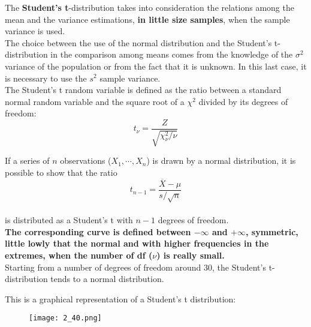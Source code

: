 \begin{frame}
  \vspace*{.3cm}
  The \textbf{Student's t}-distribution takes into consideration the relations among the mean and the variance estimations, \textbf{in little size samples}, when the sample variance is used.\\
  \vspace*{.3cm}
  The choice between the use of the normal distribution and the Student's t-distribution in the comparison among means comes from the knowledge of the $ \sigma^2 $ variance of the population or from the fact that it is unknown. In this last case, it is necessary to use the $ s^2 $ sample variance.\\
  \vspace*{.3cm}
  The Student's t random variable is defined as the ratio between a standard normal random variable and the square root of a $ \chi^2 $ divided by its degrees of freedom:
  $$ t_\nu = \frac{Z}{\sqrt{\chi^2_\nu/\nu}} $$
\end{frame}

\begin{frame}
  If a series of $ n $ observations ($ X_1, \cdots , X_n $) is drawn by a normal distribution, it is possible to show that the ratio
  \vspace*{.2cm}
  $$t_{n-1}=\frac{\overline{X}-\mu}{s/\sqrt{n}}$$\\
  \vspace*{.2cm}
  is distributed as a Student's t with $ n - 1 $ degrees of freedom. \\
  \vspace*{.5cm}
  \textbf{The corresponding curve is defined between $-\infty$ and $+\infty$, symmetric, little lowly that the normal and with higher frequencies in the extremes, when the number of df ({\boldmath $ \nu $}) is really small.}\\
  \vspace*{.5cm}
  Starting from a number of degrees of freedom around 30, the Student's t-distribution tends to a normal distribution.
\end{frame}

\begin{frame}
  \vspace*{.5cm}
  \centering
  This is a graphical representation of a Student's t distribution:\\
  \begin{figure}
    \texttt{[image: 2\_40.png]}
  \end{figure}
\end{frame}

